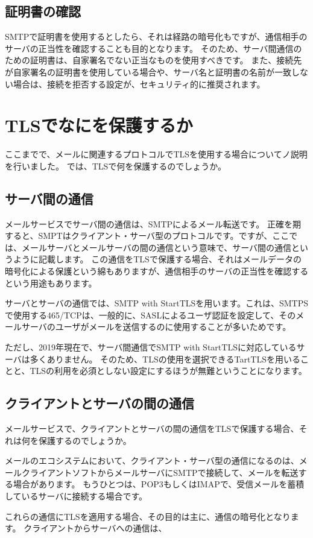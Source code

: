 \subsection{証明書の確認}

SMTPで証明書を使用するとしたら、それは経路の暗号化もですが、通信相手のサーバの正当性を確認することも目的となります。
そのため、サーバ間通信のための証明書は、自家署名でない正当なものを使用すべきです。
また、接続先が自家署名の証明書を使用している場合や、サーバ名と証明書の名前が一致しない場合は、接続を拒否する設定が、セキュリティ的に推奨されます。



\section{TLSでなにを保護するか}

ここまでで、メールに関連するプロトコルでTLSを使用する場合についてノ説明を行いました。
では、TLSで何を保護するのでしょうか。

\subsection{サーバ間の通信}

メールサービスでサーバ間の通信は、SMTPによるメール転送です。
正確を期すると、SMPTはクライアント・サーバ型のプロトコルです。ですが、ここでは、メールサーバとメールサーバの間の通信という意味で、サーバ間の通信というように記載します。
この通信をTLSで保護する場合、それはメールデータの暗号化による保護という綿もありますが、通信相手のサーバの正当性を確認するという用途もあります。

サーバとサーバの通信では、SMTP with StartTLSを用います。これは、SMTPSで使用する465/TCPは、一般的に、SASLによるユーザ認証を設定して、そのメールサーバのユーザがメールを送信するのに使用することが多いためです。

ただし、2019年現在で、サーバ間通信でSMTP with StartTLSに対応しているサーバは多くありません。
そのため、TLSの使用を選択できるTartTLSを用いることと、TLSの利用を必須としない設定にするほうが無難ということになります。


\subsection{クライアントとサーバの間の通信}

メールサービスで、クライアントとサーバの間の通信をTLSで保護する場合、それは何を保護するのでしょうか。

メールのエコシステムにおいて、クライアント・サーバ型の通信になるのは、メールクライアントソフトからメールサーバにSMTPで接続して、メールを転送する場合があります。
もうひとつは、POP3もしくはIMAPで、受信メールを蓄積しているサーバに接続する場合です。

これらの通信にTLSを適用する場合、その目的は主に、通信の暗号化となります。
クライアントからサーバへの通信は、
